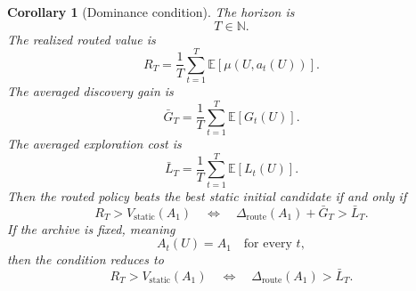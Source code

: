 \documentclass{article} %
\newtheorem{corollary}[theorem]{Corollary}
\begin{document}
\begin{corollary}[Dominance condition]
\label{cor:app-dominance}
The horizon is
\begin{equation}
\label{eq:app-fourth-dom-t}
T\in\mathbb{N}.
\end{equation}
The realized routed value is
\begin{equation}
\label{eq:app-fourth-dom-rt}
R_T
=
\frac{1}{T}
\sum_{t=1}^{T}
\mathbb{E}[\mu(U,a_t(U))].
\end{equation}
The averaged discovery gain is
\begin{equation}
\label{eq:app-fourth-dom-gbar}
\bar G_T
=
\frac{1}{T}
\sum_{t=1}^{T}
\mathbb{E}[G_t(U)].
\end{equation}
The averaged exploration cost is
\begin{equation}
\label{eq:app-fourth-dom-lbar}
\bar L_T
=
\frac{1}{T}
\sum_{t=1}^{T}
\mathbb{E}[L_t(U)].
\end{equation}
Then the routed policy beats the best static initial candidate if and only if
\begin{equation}
\label{eq:app-fourth-dom-iff}
R_T
>
V_{\mathrm{static}}(A_1)
\quad\Longleftrightarrow\quad
\Delta_{\mathrm{route}}(A_1)+\bar G_T>\bar L_T.
\end{equation}
If the archive is fixed, meaning
\begin{equation}
\label{eq:app-fourth-dom-fixed}
A_t(U)=A_1
\quad
\text{for every }t,
\end{equation}
then the condition reduces to
\begin{equation}
\label{eq:app-fourth-dom-fixed-iff}
R_T
>
V_{\mathrm{static}}(A_1)
\quad\Longleftrightarrow\quad
\Delta_{\mathrm{route}}(A_1)>\bar L_T.
\end{equation}
\end{corollary}
\end{document}
